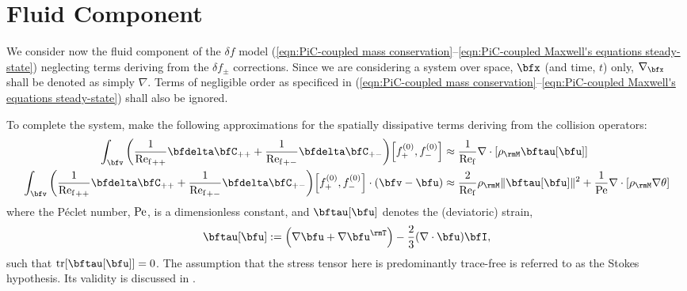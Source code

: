 \chapter{Fluid Component}




    
    We consider now the fluid component of the $\delta\!f$ model (\ref{eqn:PiC-coupled mass conservation}--\ref{eqn:PiC-coupled Maxwell's equations steady-state}) neglecting terms deriving from the $\delta\!f_{\pm}$ corrections. Since we are considering a system over space, $\bfx$ (and time, $t$) only, $\nabla_{\bfx}$ shall be denoted as simply $\nabla$. Terms of negligible order as specificed in (\ref{eqn:PiC-coupled mass conservation}--\ref{eqn:PiC-coupled Maxwell's equations steady-state}) shall also be ignored.
    
    To complete the system, make the following approximations for the spatially dissipative terms deriving from the collision operators:
    \begin{align}
        \int_{\bfv}\left(\frac{1}{{\rmRef}_{++}}\bfdelta\bfC_{++} + \frac{1}{{\rmRef}_{+-}}\bfdelta\bfC_{+-}\right)\!\left[f_{+}^{(0)}, f_{-}^{(0)}\right]                    &\approx  \frac{1}{\rmRef}\nabla\cdot[\rho_{\rmM}\bftau[\bfu]]  \\
        \int_{\bfv}\left(\frac{1}{{\rmRef}_{++}}\bfdelta\bfC_{++} + \frac{1}{{\rmRef}_{+-}}\bfdelta\bfC_{+-}\right)\!\left[f_{+}^{(0)}, f_{-}^{(0)}\right]\cdot(\bfv - \bfu)  &\approx  \frac{2}{\rmRef}\rho_{\rmM}\|\bftau[\bfu]\|^{2} + \frac{1}{\rmPe}\nabla\cdot[\rho_{\rmM}\nabla\theta]
    \end{align}
    where the Péclet number, $\mathrm{Pe}$, is a dimensionless constant, and $\bftau[\bfu]$ denotes the (deviatoric) strain,
    \begin{equation}\label{eqn:strain equation}
        \bftau[\bfu]  :=  \left(\nabla\bfu + \nabla\bfu^{\rmT}\right) - \frac{2}{3}(\nabla\cdot\bfu)\bfI,
    \end{equation}
    such that $\tr[\bftau[\bfu]]  =  0$. The assumption that the stress tensor here is predominantly trace-free is referred to as the Stokes hypothesis. \cite{Stokes_1845} Its validity is discussed in \cite{Vincenti_Kruger_1975}.

